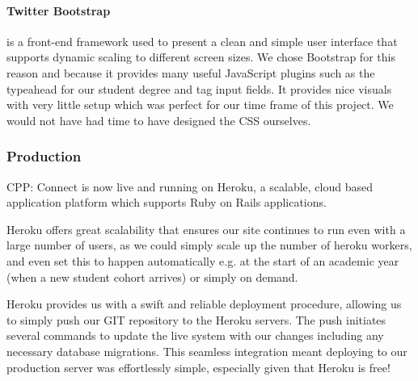 		\paragraph{Twitter Bootstrap\cite{bootstrap}} is a front-end framework used to present a clean and simple user interface that supports dynamic scaling to different screen sizes. We chose Bootstrap for this reason and because it provides many useful JavaScript plugins such as the typeahead for our student degree and tag input fields. It provides nice visuals with very little setup which was perfect for our time frame of this project. We would not have had time to have designed the CSS ourselves.

	\subsubsection{Production}
		CPP: Connect is now live and running on Heroku\cite{heroku}, a scalable, cloud based application platform which supports Ruby on Rails applications.

		Heroku offers great scalability that ensures our site continues to run even with a large number of users, as we could simply scale up the number of heroku workers, and even set this to happen automatically e.g. at the start of an academic year (when a new student cohort arrives) or simply on demand.

		Heroku provides us with a swift and reliable deployment procedure, allowing us to simply push our GIT repository to the Heroku servers. The push initiates several commands to update the live system with our changes including any necessary database migrations. This seamless integration meant deploying to our production server was effortlessly simple, especially given that Heroku is free!